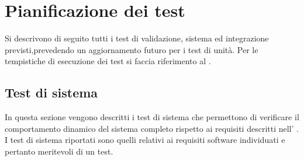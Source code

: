 \section{Pianificazione dei test}{
Si descrivono di seguito tutti i test di validazione, sistema ed integrazione previsti,prevedendo un aggiornamento futuro per i test di unità. Per le tempistiche di esecuzione
dei test si faccia riferimento al  \href{run:../../Esterni/\fPianoDiProgetto}{\fEscapePianoDiProgetto}.
\subsection{Test di sistema}{
In questa sezione vengono descritti i test di sistema che permettono di verificare il
comportamento dinamico del sistema completo rispetto ai requisiti descritti nell’ \href{run:../../Esterni/\fAnalisiDeiRequisiti}{\fEscapeAnalisiDeiRequisiti}.
	I test di sistema riportati sono quelli relativi ai requisiti software individuati e pertanto
	meritevoli di un test.
	
}}
